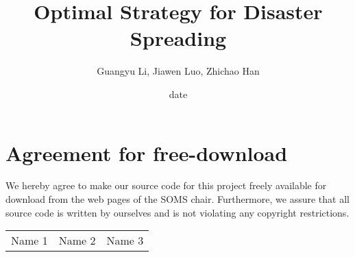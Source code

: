 \documentclass[11pt]{article}
\title{Optimal Strategy for Disaster Spreading}
\author{Guangyu Li, Jiawen Luo, Zhichao Han}
\date{date}
\begin{document}

\newpage


\newpage
\section*{Agreement for free-download}
\bigskip


\bigskip


\large We hereby agree to make our source code for this project freely available for download from the web pages of the SOMS chair. Furthermore, we assure that all source code is written by ourselves and is not violating any copyright restrictions.

\begin{center}

\bigskip


\bigskip


\begin{tabular}{@{}p{5cm}@{}@{}p{5cm}@{}@{}p{5cm}@{}}

\begin{minipage}{5cm}
\vspace{2mm} \large Name 1

 \vspace{\baselineskip}

\end{minipage}
&
\begin{minipage}{5cm}

\large Name 2

\end{minipage}
&
\begin{minipage}{5cm}

\large Name 3

\end{minipage}
\end{tabular}


\end{center}
\newpage






\end{document}
